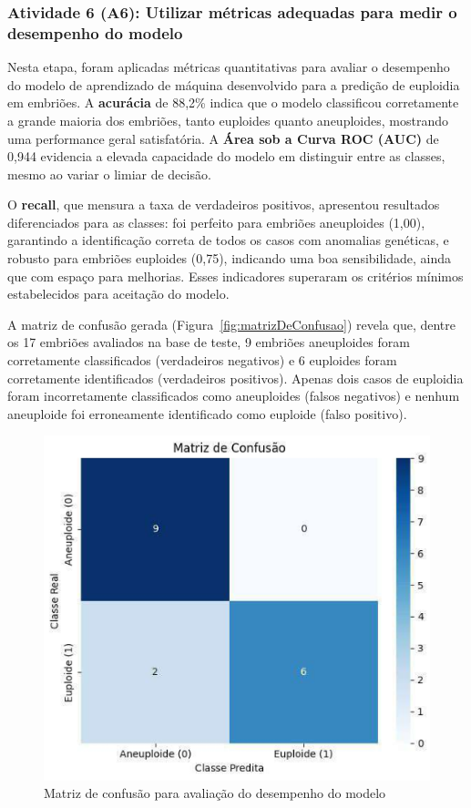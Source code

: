 \subsubsection{Atividade 6 (A6): Utilizar métricas adequadas para medir o desempenho do modelo}
Nesta etapa, foram aplicadas métricas quantitativas para avaliar o desempenho do modelo de aprendizado de máquina desenvolvido para a predição de euploidia em embriões. A \textbf{acurácia} de 88,2\% indica que o modelo classificou corretamente a grande maioria dos embriões, tanto euploides quanto aneuploides, mostrando uma performance geral satisfatória. A \textbf{Área sob a Curva ROC (AUC)} de 0,944 evidencia a elevada capacidade do modelo em distinguir entre as classes, mesmo ao variar o limiar de decisão. 

O \textbf{recall}, que mensura a taxa de verdadeiros positivos, apresentou resultados diferenciados para as classes: foi perfeito para embriões aneuploides (1,00), garantindo a identificação correta de todos os casos com anomalias genéticas, e robusto para embriões euploides (0,75), indicando uma boa sensibilidade, ainda que com espaço para melhorias. Esses indicadores superaram os critérios mínimos estabelecidos para aceitação do modelo.

A matriz de confusão gerada (Figura~\ref{fig:matrizDeConfusao}) revela que, dentre os 17 embriões avaliados na base de teste, 9 embriões aneuploides foram corretamente classificados (verdadeiros negativos) e 6 euploides foram corretamente identificados (verdadeiros positivos). Apenas dois casos de euploidia foram incorretamente classificados como aneuploides (falsos negativos) e nenhum aneuploide foi erroneamente identificado como euploide (falso positivo).

\begin{figure}[h]
    \captionsetup{font=footnotesize, justification=centering, labelsep=period, position=above}
    \label{fig:cmatrizDeConfusao}
    \centering
    \includegraphics[scale=0.11]{figuras/IA/matrizDeConfusao.pdf}
    \caption{Matriz de confusão para avaliação do desempenho do modelo}
\end{figure}
\FloatBarrier

